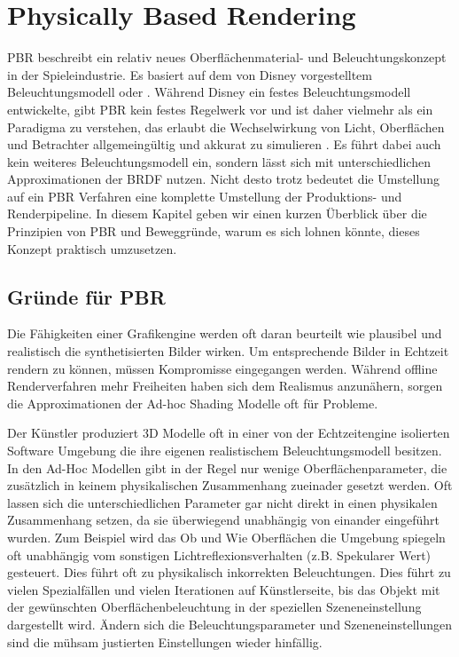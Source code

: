 \chapter{Physically Based Rendering}
\label{chap:pbr}

\acl{PBR} beschreibt ein relativ neues Oberflächenmaterial- und Beleuchtungskonzept in der Spieleindustrie. Es basiert auf dem von Disney vorgestelltem Beleuchtungsmodell \parencite{Burley2012} oder \parencite{Gotanda}. Während Disney ein festes Beleuchtungsmodell entwickelte, gibt \ac{PBR} kein festes Regelwerk vor und ist daher vielmehr als ein Paradigma zu verstehen, das erlaubt die Wechselwirkung von Licht, Oberflächen und Betrachter allgemeingültig und akkurat zu simulieren \parencite[Kapitel 1]{Rousiers2014}. Es führt dabei auch kein weiteres Beleuchtungsmodell ein, sondern lässt sich mit unterschiedlichen Approximationen der BRDF nutzen. Nicht desto trotz bedeutet die Umstellung auf ein \ac{PBR} Verfahren eine komplette Umstellung der Produktions- und Renderpipeline. In diesem Kapitel geben wir einen kurzen Überblick über die Prinzipien von \ac{PBR} und Beweggründe, warum es sich lohnen könnte, dieses Konzept praktisch umzusetzen.

\section{Gründe für \ac{PBR}}
\label{sec:pbr-warum}

Die Fähigkeiten einer Grafikengine werden oft daran beurteilt wie plausibel und realistisch die synthetisierten Bilder wirken. Um entsprechende Bilder in Echtzeit rendern zu können, müssen Kompromisse eingegangen werden. Während offline Renderverfahren mehr Freiheiten haben sich dem Realismus anzunähern, sorgen die Approximationen der Ad-hoc Shading Modelle \parencite{Martinez2010} oft für Probleme.

Der Künstler produziert 3D Modelle oft in einer von der Echtzeitengine isolierten Software Umgebung die ihre eigenen realistischem Beleuchtungsmodell besitzen. In den Ad-Hoc Modellen  gibt in der Regel nur wenige Oberflächenparameter, die zusätzlich in keinem physikalischen Zusammenhang zueinader gesetzt werden. Oft lassen sich die unterschiedlichen Parameter gar nicht direkt in einen physikalen Zusammenhang setzen, da sie überwiegend unabhängig von einander eingeführt wurden. Zum Beispiel wird das Ob und Wie Oberflächen die Umgebung spiegeln oft unabhängig vom sonstigen Lichtreflexionsverhalten (z.B. Spekularer Wert) gesteuert. Dies führt oft zu physikalisch inkorrekten Beleuchtungen. Dies führt zu vielen Spezialfällen und vielen Iterationen auf Künstlerseite, bis das Objekt mit der gewünschten Oberflächenbeleuchtung in der speziellen Szeneneinstellung dargestellt wird. Ändern sich die Beleuchtungsparameter und Szeneneinstellungen sind die mühsam justierten Einstellungen wieder hinfällig. 

